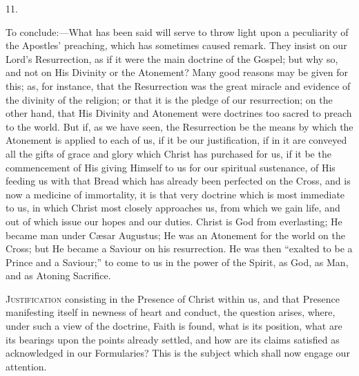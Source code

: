 11.

To conclude:—What has been said will serve to throw light upon a
peculiarity of the Apostles' preaching, which has sometimes caused
remark. They insist on our Lord's Resurrection, as if it were the main
doctrine of the Gospel; but why so, and not on His Divinity or the
Atonement? Many good reasons may be given for this; as, for instance,
that the Resurrection was the great miracle and evidence of the
divinity of the religion; or that it is the pledge of our
resurrection; on the other hand, that His Divinity and Atonement were
doctrines too sacred to preach to the world. But if, as we have seen,
the Resurrection be the means by which the Atonement is applied to
each of us, if it be our justification, if in it are conveyed all the
gifts of grace and glory which Christ has purchased for us, if it be
the commencement of His giving Himself to us for our spiritual
sustenance, of His feeding us with that Bread which has already been
perfected on the Cross, and is now a medicine of immortality, it is
that very doctrine which is most immediate to us, in which Christ most
closely approaches us, from which we gain life, and out of which issue
our hopes and our duties. Christ is God from everlasting; He became
man under Cæsar Augustus; He was an Atonement for the world on the
Cross; but He became a Saviour on his resurrection. He was then
``exalted to be a Prince and a Saviour;'' to come to us in the
power of the Spirit, as God, as Man, and as Atoning Sacrifice.


J\textsc{ustification} consisting in the Presence of Christ within us,
and that Presence manifesting itself in newness of heart and conduct,
the question arises, where, under such a view of the doctrine, Faith
is found, what is its position, what are its bearings upon the points
already settled, and how are its claims satisfied as acknowledged in
our Formularies? This is the subject which shall now engage our
attention.


